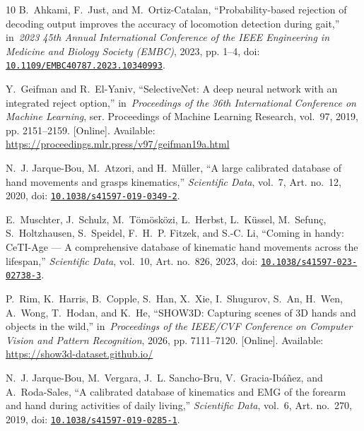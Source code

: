 \documentclass[conference,letterpaper]{IEEEtran}
\begin{document}
\begin{thebibliography}{10}
B.~Ahkami, F.~Just, and M.~Ortiz-Catalan, ``Probability-based rejection of
  decoding output improves the accuracy of locomotion detection during gait,''
  in~\emph{2023 45th Annual International Conference of the IEEE Engineering in
  Medicine and Biology Society ({EMBC})}, 2023, pp. 1--4, doi:
  \href{https://doi.org/10.1109/EMBC40787.2023.10340993}{\nolinkurl{10.1109/EMBC40787.2023.10340993}}.

\BIBentryALTinterwordspacing
Y.~Geifman and R.~El-Yaniv, ``{SelectiveNet}: A deep neural network with an
  integrated reject option,'' in~\emph{Proceedings of the 36th International
  Conference on Machine Learning}, ser. Proceedings of Machine Learning
  Research, vol.~97, 2019, pp. 2151--2159. [Online]. Available:
  \url{https://proceedings.mlr.press/v97/geifman19a.html}
\BIBentrySTDinterwordspacing

N.~J. Jarque-Bou, M.~Atzori, and H.~M{\"u}ller, ``A large calibrated database
  of hand movements and grasps kinematics,'' \emph{Scientific Data}, vol.~7,
  Art. no.~12, 2020, doi:
  \href{https://doi.org/10.1038/s41597-019-0349-2}{\nolinkurl{10.1038/s41597-019-0349-2}}.

E.~Muschter, J.~Schulz, M.~T{\"o}m{\"o}sk{\"o}zi, L.~Herbst, L.~K{\"u}ssel,
  M.~Sefun{\c c}, S.~Holtzhausen, S.~Speidel, F.~H.~P. Fitzek, and S.-C. Li,
  ``Coming in handy: {CeTI-Age} --- {A} comprehensive database of kinematic
  hand movements across the lifespan,'' \emph{Scientific Data}, vol.~10, Art.
  no.~826, 2023, doi:
  \href{https://doi.org/10.1038/s41597-023-02738-3}{\nolinkurl{10.1038/s41597-023-02738-3}}.

\BIBentryALTinterwordspacing
P.~Rim, K.~Harris, B.~Copple, S.~Han, X.~Xie, I.~Shugurov, S.~An, H.~Wen,
  A.~Wong, T.~Hodan, and K.~He, ``{SHOW3D}: Capturing scenes of {3D} hands and
  objects in the wild,'' in~\emph{Proceedings of the {IEEE/CVF} Conference on
  Computer Vision and Pattern Recognition}, 2026, pp. 7111--7120. [Online].
  Available: \url{https://show3d-dataset.github.io/}
\BIBentrySTDinterwordspacing

N.~J. Jarque-Bou, M.~Vergara, J.~L. Sancho-Bru, V.~Gracia-Ib{\'a}{\~n}ez, and
  A.~Roda-Sales, ``A calibrated database of kinematics and {EMG} of the forearm
  and hand during activities of daily living,'' \emph{Scientific Data}, vol.~6,
  Art. no.~270, 2019, doi:
  \href{https://doi.org/10.1038/s41597-019-0285-1}{\nolinkurl{10.1038/s41597-019-0285-1}}.

\end{thebibliography}
\end{document}
